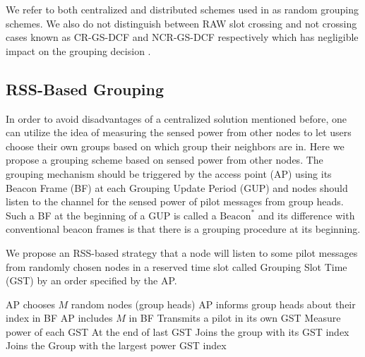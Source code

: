 We refer to both centralized and distributed schemes used in \cite{zheng2014performance} as random grouping schemes. We also do not distinguish between RAW slot crossing and not crossing cases known as CR-GS-DCF and NCR-GS-DCF respectively which has negligible impact on the grouping decision \cite{Draft80211ah}. 

\subsection{RSS-Based Grouping}
\label{rssbasedmain}
In order to avoid disadvantages of a centralized solution mentioned before, one can utilize the idea of measuring the sensed power from other nodes to let users choose their own groups based on which group their neighbors are in. Here we propose a grouping scheme based on sensed power from other nodes. %
The grouping mechanism should be triggered by the access point (AP) using its Beacon Frame (BF) at each Grouping Update Period (GUP) and nodes should listen to the channel for the sensed power of pilot messages from group heads. Such a BF at the beginning of a GUP is called a $\text{Beacon}^\ast$ and its difference with conventional beacon frames is that there is a grouping procedure at its beginning. 




We propose an RSS-based strategy that a node will listen to some pilot messages from randomly chosen nodes in a reserved time slot called Grouping Slot Time (GST) by an order specified by the AP.

\begin{algorithmic}
\STATE AP chooses $M$ random nodes (group heads)
\STATE AP informs group heads about their index in BF
\STATE AP includes $M$ in BF
\STATE Transmits a pilot in its own GST
\ELSE
\STATE Measure power of each GST
\ENDIF
\ENDFOR
\STATE At the end of last GST
\STATE Joins the group with its GST index
\ELSE
\STATE Joins the Group with the largest power GST index
\ENDIF
\ENDFOR
\ENDFOR
\end{algorithmic}

